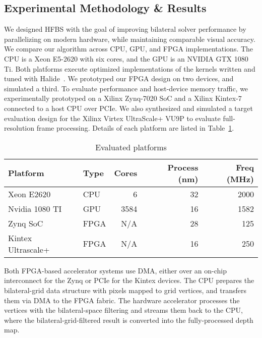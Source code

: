 
\subsection{Experimental Methodology \& Results}
We designed HFBS with the goal of improving bilateral solver performance by parallelizing on modern hardware, while maintaining comparable visual accuracy. 
We compare our algorithm across CPU, GPU, and FPGA implementations. 
The CPU is a Xeon E5-2620 with six cores, and the GPU is an NVIDIA GTX 1080 Ti.
Both platforms execute optimized implementations of the kernels written and tuned with Halide~\cite{halide}.
We prototyped our FPGA design on two devices, and simulated a third. 
To evaluate performance and host-device memory traffic, we experimentally prototyped on a Xilinx Zynq-7020 SoC and  a Xilinx Kintex-7 connected to a host CPU over PCIe.
We also synthesized and simulated a target evaluation design for the Xilinx Virtex UltraScale+ VU9P to evaluate full-resolution frame processing.
Details of each platform are listed in Table~\ref{evaluated-platforms}.

\begin{table}[h]
\centering
\caption{Evaluated platforms}
\begin{tabular}{@{}llrrr@{}}
\toprule
Platform & Type & Cores & Process (nm) & Freq (MHz) \\ \midrule
Xeon E2620 & CPU & 6 & 32 & 2000 \\
Nvidia 1080 TI & GPU & 3584 & 16 & 1582 \\
Zynq SoC & FPGA & N/A & 28 & 125 \\
Kintex Ultrascale+ & FPGA & N/A & 16 & 250 \\
\bottomrule
\end{tabular}
\label{evaluated-platforms}
\end{table}

Both FPGA-based accelerator systems use DMA, either over an on-chip interconnect for the Zynq or PCIe for the Kintex devices. 
The CPU prepares the bilateral-grid data structure with pixels mapped to grid vertices, and transfers them via DMA to the FPGA fabric. 
The hardware accelerator processes the vertices with the bilateral-space filtering and streams them back to the CPU, where the bilateral-grid-filtered result is converted into the fully-processed depth map.

